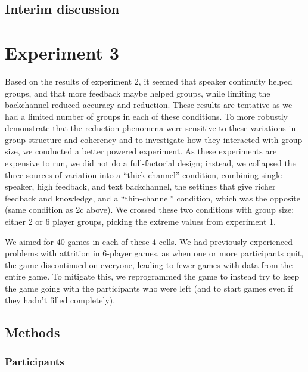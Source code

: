 \documentclass[
  english,
  a4paper,
]{article}
\begin{document}
\hypertarget{interim-discussion-1}{%
\subsection{Interim discussion}\label{interim-discussion-1}}

\hypertarget{experiment-3}{%
\section{Experiment 3}\label{experiment-3}}

Based on the results of experiment 2, it seemed that speaker continuity helped groups, and that more feedback maybe helped groups, while limiting the backchannel reduced accuracy and reduction. These results are tentative as we had a limited number of groups in each of these conditions. To more robustly demonstrate that the reduction phenomena were sensitive to these variations in group structure and coherency and to investigate how they interacted with group size, we conducted a better powered experiment. As these experiments are expensive to run, we did not do a full-factorial design; instead, we collapsed the three sources of variation into a ``thick-channel'' condition, combining single speaker, high feedback, and text backchannel, the settings that give richer feedback and knowledge, and a ``thin-channel'' condition, which was the opposite (same condition as 2c above). We crossed these two conditions with group size: either 2 or 6 player groups, picking the extreme values from experiment 1.

We aimed for 40 games in each of these 4 cells. We had previously experienced problems with attrition in 6-player games, as when one or more participants quit, the game discontinued on everyone, leading to fewer games with data from the entire game. To mitigate this, we reprogrammed the game to instead try to keep the game going with the participants who were left (and to start games even if they hadn't filled completely).

\hypertarget{methods-2}{%
\subsection{Methods}\label{methods-2}}

\hypertarget{participants-2}{%
\subsubsection{Participants}\label{participants-2}}
\end{document}

